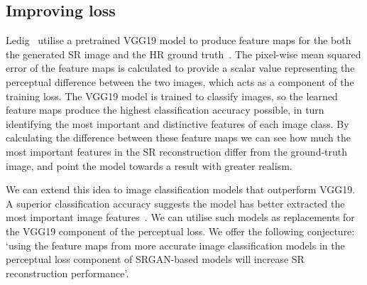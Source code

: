 \subsection{Improving loss}\label{subsec:improving_loss}
Ledig \etal\ utilise a pretrained VGG19 model to produce feature maps for the both the generated SR image and the HR ground truth~\cite{srgan}. The pixel-wise mean squared error of the feature maps is calculated to provide a scalar value representing the perceptual difference between the two images, which acts as a component of the training loss. The VGG19 model is trained to classify images, so the learned feature maps produce the highest classification accuracy possible, in turn identifying the most important and distinctive features of each image class. By calculating the difference between these feature maps we can see how much the most important features in the SR reconstruction differ from the ground-truth image, and point the model towards a result with greater realism.

We can extend this idea to image classification models that outperform VGG19. A superior classification accuracy suggests the model has better extracted the most important image features~\cite{imageNet}. We can utilise such models as replacements for the VGG19 component of the perceptual loss. We offer the following conjecture: `using the feature maps from more accurate image classification models in the perceptual loss component of SRGAN-based models will increase SR reconstruction performance'.

